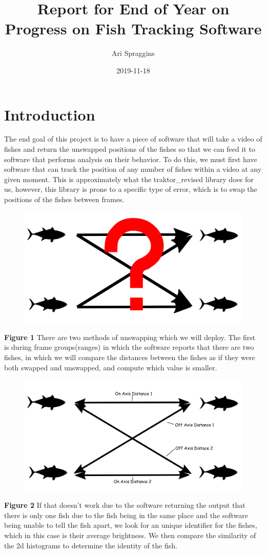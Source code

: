 \documentclass[12pt]{article}
\title{Report for End of Year on Progress on Fish Tracking Software}
\author{Ari Spraggins}
\date{2019-11-18}
\begin{document}
\maketitle
{}

\section{Introduction}

The end goal of this project is to have a piece of software that will take a video of fishes and return the unswapped positions of the fishes so that we can feed it to software that performs analysis on their behavior. To do this, we must first have software that can track the position of any number of fishes within a video at any given moment. This is approximately what the traktor\_revised library does for us, however, this library is prone to a specific type of error, which is to swap the positions of the fishes between frames.
\begin{figure}[h] 
	\centering
	\includegraphics[width=.5\textwidth]{fish1}
	\caption{}
\end{figure}
\textbf{Figure 1} There are two methods of unswapping which we will deploy. The first is during frame groups(ranges) in which the software reports that there are two fishes, in which we will compare the distances between the fishes as if they were both swapped and unswapped, and compute which value is smaller.
\begin{figure}[h] 
	\centering
	\includegraphics[width=.5\textwidth]{fish2}
	\caption{}
\end{figure}
\textbf{Figure 2} If that doesn't work due to the software returning the output that there is only one fish due to the fish being in the same place and the software being unable to tell the fish apart, we look for an unique identifier for the fishes, which in this case is their average brightness. We then compare the similarity of the 2d histograms to determine the identity of the fish. \par
\end{document}
